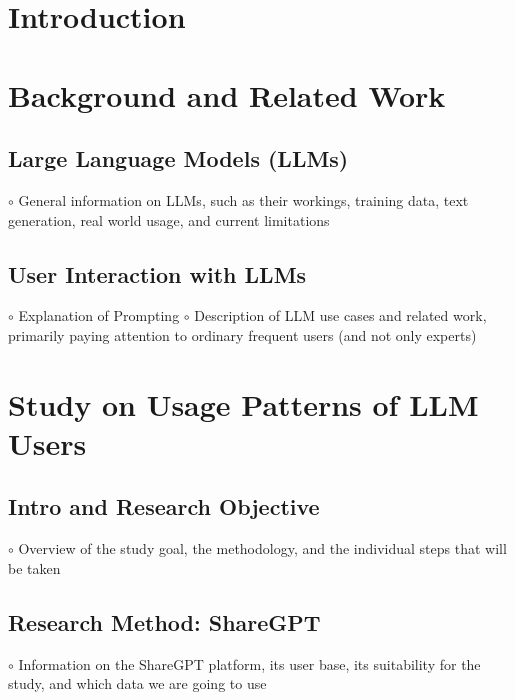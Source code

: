 \documentclass[sigconf]{acmart}
\begin{document}



\maketitle


\section{Introduction}

\section{Background and Related Work}
  \subsection{Large Language Models (LLMs)}
$\circ$ General information on LLMs, such as their workings, training data, text generation, real world usage, and current limitations
  \subsection{User Interaction with LLMs}
$\circ$ Explanation of Prompting \newline
$\circ$ Description of LLM use cases and related work, primarily paying attention to ordinary frequent users (and not only experts)

\section{Study on Usage Patterns of LLM Users}
  \subsection{Intro and Research Objective}
$\circ$ Overview of the study goal, the methodology, and the individual steps that will be taken
  \subsection{Research Method: ShareGPT}
$\circ$ Information on the ShareGPT platform, its user base, its suitability for the study, and which data we are going to use
\end{document}
